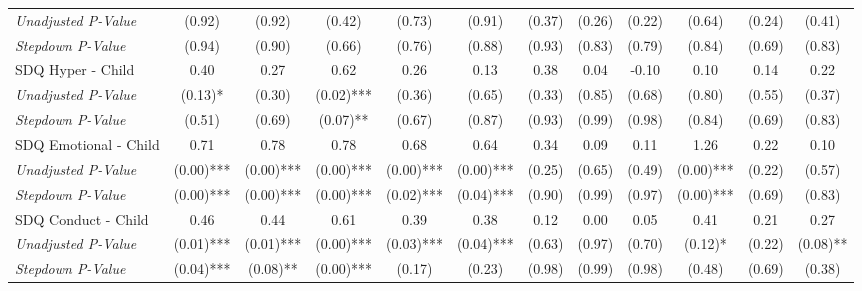 \begin{tabular}{l c c c c c c c c c c c}
\quad \textit{Unadjusted P-Value} & (0.92) & (0.92) & (0.42) & (0.73) & (0.91) & (0.37) & (0.26) & (0.22) & (0.64) & (0.24) & (0.41) \\
\quad \textit{Stepdown P-Value} & (0.94) & (0.90) & (0.66) & (0.76) & (0.88) & (0.93) & (0.83) & (0.79) & (0.84) & (0.69) & (0.83) \\
SDQ Hyper - Child & 0.40 & 0.27 & 0.62 & 0.26 & 0.13 & 0.38 & 0.04 & -0.10 & 0.10 & 0.14 & 0.22 \\
\quad \textit{Unadjusted P-Value} & (0.13)* & (0.30) & (0.02)*** & (0.36) & (0.65) & (0.33) & (0.85) & (0.68) & (0.80) & (0.55) & (0.37) \\
\quad \textit{Stepdown P-Value} & (0.51) & (0.69) & (0.07)** & (0.67) & (0.87) & (0.93) & (0.99) & (0.98) & (0.84) & (0.69) & (0.83) \\
SDQ Emotional - Child & 0.71 & 0.78 & 0.78 & 0.68 & 0.64 & 0.34 & 0.09 & 0.11 & 1.26 & 0.22 & 0.10 \\
\quad \textit{Unadjusted P-Value} & (0.00)*** & (0.00)*** & (0.00)*** & (0.00)*** & (0.00)*** & (0.25) & (0.65) & (0.49) & (0.00)*** & (0.22) & (0.57) \\
\quad \textit{Stepdown P-Value} & (0.00)*** & (0.00)*** & (0.00)*** & (0.02)*** & (0.04)*** & (0.90) & (0.99) & (0.97) & (0.00)*** & (0.69) & (0.83) \\
SDQ Conduct - Child & 0.46 & 0.44 & 0.61 & 0.39 & 0.38 & 0.12 & 0.00 & 0.05 & 0.41 & 0.21 & 0.27 \\
\quad \textit{Unadjusted P-Value} & (0.01)*** & (0.01)*** & (0.00)*** & (0.03)*** & (0.04)*** & (0.63) & (0.97) & (0.70) & (0.12)* & (0.22) & (0.08)** \\
\quad \textit{Stepdown P-Value} & (0.04)*** & (0.08)** & (0.00)*** & (0.17) & (0.23) & (0.98) & (0.99) & (0.98) & (0.48) & (0.69) & (0.38) \\
\bottomrule
\end{tabular}
